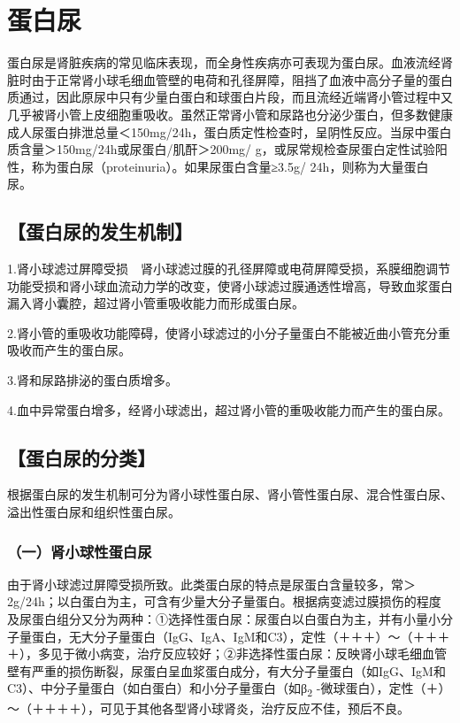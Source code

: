 \chapter{蛋白尿}

蛋白尿是肾脏疾病的常见临床表现，而全身性疾病亦可表现为蛋白尿。血液流经肾脏时由于正常肾小球毛细血管壁的电荷和孔径屏障，阻挡了血液中高分子量的蛋白质通过，因此原尿中只有少量白蛋白和球蛋白片段，而且流经近端肾小管过程中又几乎被肾小管上皮细胞重吸收。虽然正常肾小管和尿路也分泌少蛋白，但多数健康成人尿蛋白排泄总量＜150mg/24h，蛋白质定性检查时，呈阴性反应。当尿中蛋白质含量＞150mg/24h或尿蛋白/肌酐＞200mg/
g，或尿常规检查尿蛋白定性试验阳性，称为蛋白尿（proteinuria）。如果尿蛋白含量≥3.5g/
24h，则称为大量蛋白尿。

\section{【蛋白尿的发生机制】}

1.肾小球滤过屏障受损　肾小球滤过膜的孔径屏障或电荷屏障受损，系膜细胞调节功能受损和肾小球血流动力学的改变，使肾小球滤过膜通透性增高，导致血浆蛋白漏入肾小囊腔，超过肾小管重吸收能力而形成蛋白尿。

2.肾小管的重吸收功能障碍，使肾小球滤过的小分子量蛋白不能被近曲小管充分重吸收而产生的蛋白尿。

3.肾和尿路排泌的蛋白质增多。

4.血中异常蛋白增多，经肾小球滤出，超过肾小管的重吸收能力而产生的蛋白尿。

\section{【蛋白尿的分类】}

根据蛋白尿的发生机制可分为肾小球性蛋白尿、肾小管性蛋白尿、混合性蛋白尿、溢出性蛋白尿和组织性蛋白尿。

\subsection{（一）肾小球性蛋白尿}

由于肾小球滤过屏障受损所致。此类蛋白尿的特点是尿蛋白含量较多，常＞2g/24h；以白蛋白为主，可含有少量大分子量蛋白。根据病变滤过膜损伤的程度及尿蛋白组分又分为两种：①选择性蛋白尿：尿蛋白以白蛋白为主，并有小量小分子量蛋白，无大分子量蛋白（IgG、IgA、IgM和C3），定性（＋＋＋）～（＋＋＋＋），多见于微小病变，治疗反应较好；②非选择性蛋白尿：反映肾小球毛细血管壁有严重的损伤断裂，尿蛋白呈血浆蛋白成分，有大分子量蛋白（如IgG、IgM和C3）、中分子量蛋白（如白蛋白）和小分子量蛋白（如β\textsubscript{2}
-微球蛋白），定性（＋）～（＋＋＋＋），可见于其他各型肾小球肾炎，治疗反应不佳，预后不良。

